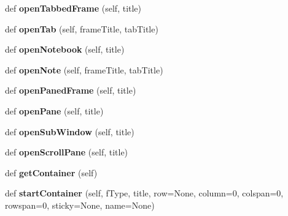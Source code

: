 \begin{DoxyCompactItemize}
def {\bfseries open\+Tabbed\+Frame} (self, title)
\item 
\mbox{\label{class_python_01_g_u_i_1_1appjar_1_1gui_a264729a44aebb5ca57bfc1adf120a279}} 
def {\bfseries open\+Tab} (self, frame\+Title, tab\+Title)
\item 
\mbox{\label{class_python_01_g_u_i_1_1appjar_1_1gui_a5377d516bb1af5dea2c8e7e71fc08eb4}} 
def {\bfseries open\+Notebook} (self, title)
\item 
\mbox{\label{class_python_01_g_u_i_1_1appjar_1_1gui_ad0d5e09e800387900e4694b2f92664fe}} 
def {\bfseries open\+Note} (self, frame\+Title, tab\+Title)
\item 
\mbox{\label{class_python_01_g_u_i_1_1appjar_1_1gui_ac10c7cee398d21d9914c3517798fc8ec}} 
def {\bfseries open\+Paned\+Frame} (self, title)
\item 
\mbox{\label{class_python_01_g_u_i_1_1appjar_1_1gui_ab9d18ef7571a7464a39c8e7b05ccfa80}} 
def {\bfseries open\+Pane} (self, title)
\item 
\mbox{\label{class_python_01_g_u_i_1_1appjar_1_1gui_af8d4eaf5221e9e52369268a4340cbdf3}} 
def {\bfseries open\+Sub\+Window} (self, title)
\item 
\mbox{\label{class_python_01_g_u_i_1_1appjar_1_1gui_a513f5cd5afdbeceeecda090d536e8baa}} 
def {\bfseries open\+Scroll\+Pane} (self, title)
\item 
\mbox{\label{class_python_01_g_u_i_1_1appjar_1_1gui_aa89c83e95e3952f6cc39fc23dffa15ce}} 
def {\bfseries get\+Container} (self)
\item 
\mbox{\label{class_python_01_g_u_i_1_1appjar_1_1gui_a114a93e3692dd254371a5f7eba7c5fb5}} 
def {\bfseries start\+Container} (self, f\+Type, title, row=None, column=0, colspan=0, rowspan=0, sticky=None, name=None)
\item 

\end{DoxyCompactItemize}
